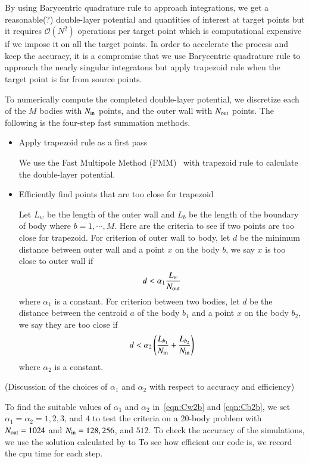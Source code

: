 \documentclass[preprint, 10pt]{elsarticle}
\begin{document}
{\color{red}
By using Barycentric quadrature rule to approach integrations, we get a reasonable(?) double-layer potential and quantities of interest at target points but it requires $\mathcal{O}(N^2)$ operations per target point which is computational expensive if we impose it on all the target points. In order to accelerate the process and keep the accuracy, it is a compromise that we use Barycentric quadrature rule to approach the nearly singular integratons but apply trapezoid rule when the target point is far from source points. 


To numerically compute the completed double-layer potential, we discretize each of the $M$ bodies with  $N_{\mathrm{in}}$ points, and the outer wall with $N_{\mathrm{out}}$ points. The following is the four-step fast summation methods.
}
\begin{itemize}
  \item Apply trapezoid rule as a first pass

{\color{red} We use the Fast Multipole Method (FMM)~\cite{gre-rok1987, gre-gre-may1992} with trapezoid rule to calculate the double-layer potential.
}
  \item Efficiently find points that are too close for trapezoid

{\color{red}
 Let $L_w$ be the length of the outer wall and $L_{b}$ be the length of the boundary of body where $b=1, \cdots, M$. Here are the criteria to see if two points are too close for trapezoid. For criterion of outer wall to body,  let $d$ be the minimum distance between outer wall and a point $x$ on the body $b$, we say $x$ is too close to outer wall if
\begin{equation}\label{eqn:Cw2b}
d< \alpha_1\frac{L_w}{N_{\mathrm{out}}}
\end{equation}
where $\alpha_1$ is a constant. 
For criterion between two bodies, let $d$ be the distance between the centroid $a$ of the body $b_1$ and a point $x$ on the body $b_2$, we say they are too close if
\begin{equation}\label{eqn:Cb2b}
d<\alpha_2\left(\frac{L_{b_1}}{N_{\mathrm{in}}}+\frac{L_{b_2}}{N_{\mathrm{in}}}\right)
\end{equation}
where $\alpha_2$ is a constant. 

}
\end{itemize}
{\color{red}  (Discussion of the choices of $\alpha_1$ and $\alpha_2$ with respect to accuracy and  efficiency)

To find the suitable values of $\alpha_1$ and $\alpha_2$ in~\eqref{eqn:Cw2b} and \eqref{eqn:Cb2b}, we set $\alpha_1=\alpha_2=1, 2, 3$, and $4$ to test the criteria on a 20-body problem with $N_{\mathrm{out}} = 1024$ and $N_{\mathrm{in}} = 128, 256$, and $512$. To check the accuracy of the simulations, we use the solution calculated by  to 
To see how efficient our code is, we record the cpu time for each step.

}
\end{document}
